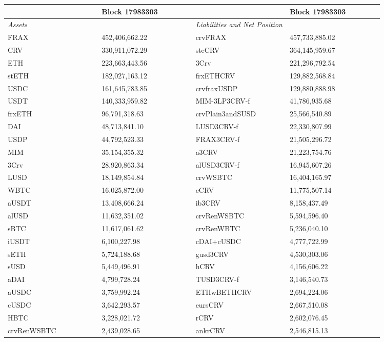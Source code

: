 
\begin{longtable}{@{}p{0.25\linewidth}p{0.25\linewidth}p{0.25\linewidth}p{0.25\linewidth}@{}}

\toprule


& Block 17983303 & & Block 17983303 \\

\midrule
\textit{Assets} & & \textit{Liabilities and Net Position} \\
FRAX & 452,406,662.22 & crvFRAX &457,733,885.02 \\
CRV & 330,911,072.29 & steCRV &364,145,959.67 \\
ETH & 223,663,443.56 & 3Crv &221,296,792.54 \\
stETH & 182,027,163.12 & frxETHCRV &129,882,568.84 \\
USDC & 161,645,783.85 & crvfraxUSDP &129,880,888.98 \\
USDT & 140,333,959.82 & MIM-3LP3CRV-f &41,786,935.68 \\
frxETH & 96,791,318.63 & crvPlain3andSUSD &25,566,540.89 \\
DAI & 48,713,841.10 & LUSD3CRV-f &22,330,807.99 \\
USDP & 44,792,523.33 & FRAX3CRV-f &21,505,296.72 \\
MIM & 35,154,355.32 & a3CRV &21,223,754.76 \\
3Crv & 28,920,863.34 & alUSD3CRV-f &16,945,607.26 \\
LUSD & 18,149,854.84 & crvWSBTC &16,404,165.97 \\
WBTC & 16,025,872.00 & eCRV &11,775,507.14 \\
aUSDT & 13,408,666.24 & ib3CRV &8,158,437.49 \\
alUSD & 11,632,351.02 & crvRenWSBTC &5,594,596.40 \\
sBTC & 11,617,061.62 & crvRenWBTC &5,236,040.10 \\
iUSDT & 6,100,227.98 & cDAI+cUSDC &4,777,722.99 \\
sETH & 5,724,188.68 & gusd3CRV &4,530,303.06 \\
sUSD & 5,449,496.91 & hCRV &4,156,606.22 \\
aDAI & 4,799,728.24 & TUSD3CRV-f &3,146,540.73 \\
aUSDC & 3,759,992.24 & ETHwBETHCRV &2,694,224.06 \\
cUSDC & 3,642,293.57 & eursCRV &2,667,510.08 \\
HBTC & 3,228,021.72 & rCRV &2,602,076.45 \\
crvRenWSBTC & 2,439,028.65 & ankrCRV &2,546,815.13 \\

\end{longtable}
